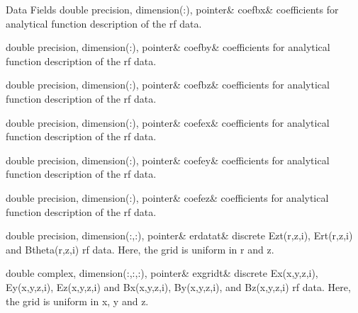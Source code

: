 \begin{DoxyFields}{Data Fields}
\mbox{\label{namespacedataclass_a0c95af7afe48564d7065f649721debdc}} 
double precision, dimension(:), pointer&
coefbx&
coefficients for analytical function description of the rf data. \\
\hline

\mbox{\label{namespacedataclass_ac26d841a700857f9b65f1147ab8bf24a}} 
double precision, dimension(:), pointer&
coefby&
coefficients for analytical function description of the rf data. \\
\hline

\mbox{\label{namespacedataclass_a0ac127e563d111a24880b7cc56e07491}} 
double precision, dimension(:), pointer&
coefbz&
coefficients for analytical function description of the rf data. \\
\hline

\mbox{\label{namespacedataclass_a98c251dcd14437d01d46d7266332149c}} 
double precision, dimension(:), pointer&
coefex&
coefficients for analytical function description of the rf data. \\
\hline

\mbox{\label{namespacedataclass_adba1751ff1e26a2ec445a4f51f4478b7}} 
double precision, dimension(:), pointer&
coefey&
coefficients for analytical function description of the rf data. \\
\hline

\mbox{\label{namespacedataclass_afc267a03647ee5be553ada88d6f61731}} 
double precision, dimension(:), pointer&
coefez&
coefficients for analytical function description of the rf data. \\
\hline

\mbox{\label{namespacedataclass_ad0dd726b937d1856f802836eef2a022f}} 
double precision, dimension(:,:), pointer&
erdatat&
discrete Ezt(r,z,i), Ert(r,z,i) and Btheta(r,z,i) rf data. Here, the grid is uniform in r and z. \\
\hline

\mbox{\label{namespacedataclass_ab07faecce00908ad73041a02d4906c31}} 
double complex, dimension(:,:,:), pointer&
exgridt&
discrete Ex(x,y,z,i), Ey(x,y,z,i), Ez(x,y,z,i) and Bx(x,y,z,i), By(x,y,z,i), and Bz(x,y,z,i) rf data. Here, the grid is uniform in x, y and z. \\
\hline


\end{DoxyFields}
